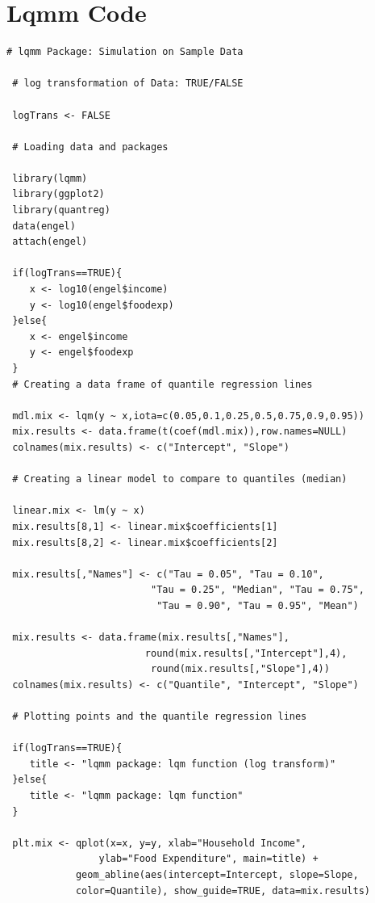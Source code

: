 \documentclass[12pt,a4paper]{report}
\begin{document}
\section{Lqmm Code}\label{App:Engel-Code-lqmm}
\begin{lstlisting}
# lqmm Package: Simulation on Sample Data

 # log transformation of Data: TRUE/FALSE

 logTrans <- FALSE

 # Loading data and packages

 library(lqmm)
 library(ggplot2)
 library(quantreg)
 data(engel)
 attach(engel)

 if(logTrans==TRUE){
    x <- log10(engel$income)
    y <- log10(engel$foodexp)
 }else{
    x <- engel$income
    y <- engel$foodexp
 }
 # Creating a data frame of quantile regression lines

 mdl.mix <- lqm(y ~ x,iota=c(0.05,0.1,0.25,0.5,0.75,0.9,0.95))
 mix.results <- data.frame(t(coef(mdl.mix)),row.names=NULL)
 colnames(mix.results) <- c("Intercept", "Slope")

 # Creating a linear model to compare to quantiles (median)

 linear.mix <- lm(y ~ x)
 mix.results[8,1] <- linear.mix$coefficients[1]
 mix.results[8,2] <- linear.mix$coefficients[2]

 mix.results[,"Names"] <- c("Tau = 0.05", "Tau = 0.10",
                         "Tau = 0.25", "Median", "Tau = 0.75",
                          "Tau = 0.90", "Tau = 0.95", "Mean")

 mix.results <- data.frame(mix.results[,"Names"],
                        round(mix.results[,"Intercept"],4),
                         round(mix.results[,"Slope"],4))
 colnames(mix.results) <- c("Quantile", "Intercept", "Slope")

 # Plotting points and the quantile regression lines

 if(logTrans==TRUE){
    title <- "lqmm package: lqm function (log transform)"
 }else{
    title <- "lqmm package: lqm function"
 }

 plt.mix <- qplot(x=x, y=y, xlab="Household Income",
                ylab="Food Expenditure", main=title) +
            geom_abline(aes(intercept=Intercept, slope=Slope,
            color=Quantile), show_guide=TRUE, data=mix.results)

\end{lstlisting}
\end{document}
